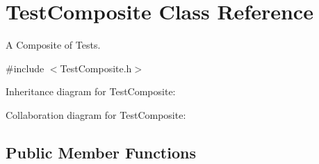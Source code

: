 \hypertarget{class_test_composite}{\section{Test\+Composite Class Reference}
\label{class_test_composite}
}


A Composite of Tests.  




{\ttfamily \#include $<$Test\+Composite.\+h$>$}



Inheritance diagram for Test\+Composite\+:


Collaboration diagram for Test\+Composite\+:
\subsection*{Public Member Functions}
